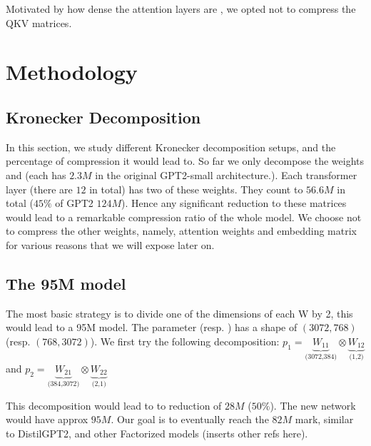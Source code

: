 \documentclass{article}
\begin{document}
Motivated by how dense the attention layers are \cite{}, we opted not to compress the QKV matrices.  






\section{Methodology}%
\label{sec:Training setups}

\subsection{Kronecker Decomposition}%
\label{sub:Kronecker Decomposition}

In this section, we study different Kronecker decomposition setups, and the percentage of compression it would  lead to. So far we only decompose the weights  and  (each has $2.3M$ in the original GPT2-small architecture.). Each transformer layer (there are $12$ in total) has two of these weights. They count to $56.6M$ in total ($45\%$ of GPT2 $124M$). Hence any significant reduction to these matrices would lead to a remarkable compression ratio of the whole model. We choose not to compress the other weights, namely, attention weights and embedding matrix for various reasons that we will expose later on. 

\subsection{The 95M model}%
\label{sub:The 95M model}
The most basic strategy is to divide one of the dimensions of each W by 2, this would lead to a 95M model. The parameter  (resp. ) has a shape of $(3072, 768)$ (resp.  $(768, 3072)$). We first try the following decomposition: $p_1 = \underbrace{W_{11}}_{\text{(3072,384)}} \otimes \underbrace{W_{12}}_{\text{(1,2)}}$  and $p_2 = \underbrace{W_{21}}_{\text{(384,3072)}} \otimes \underbrace{W_{22}}_{\text{(2,1)}}$  


This decomposition would lead to to reduction of $28M$ ($50\%$). The new network would have approx $95M$. Our goal is to eventually reach the $82M$ mark, similar to DistilGPT2, and other Factorized models (inserts other refs here).
\end{document}
